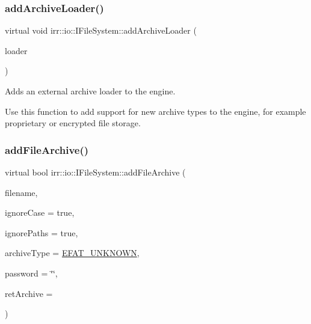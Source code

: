 \subsubsection{\texorpdfstring{add\+Archive\+Loader()}{addArchiveLoader()}\hspace{0.1cm}{\footnotesize\ttfamily [2/2]}}
{\footnotesize\ttfamily virtual void irr\+::io\+::\+I\+File\+System\+::add\+Archive\+Loader (\begin{DoxyParamCaption}\item[{\hyperlink{classirr_1_1io_1_1IArchiveLoader}{I\+Archive\+Loader} $\ast$}]{loader }\end{DoxyParamCaption})\hspace{0.3cm}{\ttfamily [pure virtual]}}



Adds an external archive loader to the engine. 

Use this function to add support for new archive types to the engine, for example proprietary or encrypted file storage. \mbox{\label{classirr_1_1io_1_1IFileSystem_afe6641c7f88a8fea0205c113b8379730}} 
\subsubsection{\texorpdfstring{add\+File\+Archive()}{addFileArchive()}\hspace{0.1cm}{\footnotesize\ttfamily [1/6]}}
{\footnotesize\ttfamily virtual bool irr\+::io\+::\+I\+File\+System\+::add\+File\+Archive (\begin{DoxyParamCaption}\item[{const \hyperlink{namespaceirr_1_1io_a6468281622ce3a1c46b72e19f32dded5}{path} \&}]{filename,  }\item[{bool}]{ignore\+Case = {\ttfamily true},  }\item[{bool}]{ignore\+Paths = {\ttfamily true},  }\item[{\hyperlink{namespaceirr_1_1io_adb3e3c445ec8e608ed1f0f93306da14f}{E\+\_\+\+F\+I\+L\+E\+\_\+\+A\+R\+C\+H\+I\+V\+E\+\_\+\+T\+Y\+PE}}]{archive\+Type = {\ttfamily \hyperlink{namespaceirr_1_1io_adb3e3c445ec8e608ed1f0f93306da14fa7a4f7d9873f9705cd6dc73191e7d8359}{E\+F\+A\+T\+\_\+\+U\+N\+K\+N\+O\+WN}},  }\item[{const \hyperlink{namespaceirr_1_1core_ab26a0e0359206b5a694f35c37c829d7f}{core\+::stringc} \&}]{password = {\ttfamily \char`\"{}\char`\"{}},  }\item[{\hyperlink{classirr_1_1io_1_1IFileArchive}{I\+File\+Archive} $\ast$$\ast$}]{ret\+Archive = {} }\end{DoxyParamCaption})\hspace{0.3cm}{\ttfamily [pure virtual]}}



